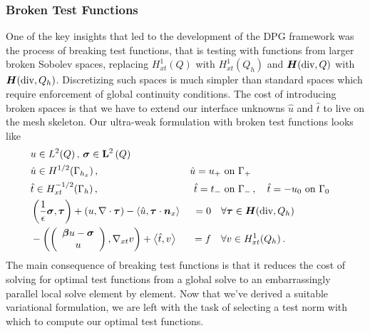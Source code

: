 \documentclass{article}
\begin{document}
\subsubsection{Broken Test Functions}
One of the key insights that led to the development of the DPG framework was the process of breaking test functions, 
that is testing with functions from larger broken Sobolev spaces, replacing $H^1_{xt}(Q)$ with  $H^1_{xt}(Q_h)$ 
and $\mbox{\boldmath $H$}(\text{div},Q)$ with $\mbox{\boldmath $H$}(\text{div},Q_h)$.
Discretizing such spaces is much simpler than standard spaces which require enforcement of global continuity conditions.
The cost of introducing broken spaces is that we have to extend our interface unknowns $\hat u$ and $\hat t$ 
to live on the mesh skeleton. %
Our ultra-weak formulation with broken test functions looks like
\begin{equation}
\label{eq:confusionUltraWeakBrokenBF}
	\begin{aligned}
		&u\in L^2(Q)\,,\,\boldsymbol\sigma\in\mathbf{L}^2\left( Q \right)\\
		&\hat u\in H^{1/2}(\Gamma_{h_x})\,,\,&\hat u=u_+&\text{ on }\Gamma_+\\
		&\hat t\in H^{-1/2}_{xt}(\Gamma_h)\,,\,&\hat t=t_-&\text{ on }\Gamma_-\,,\quad\hat t=-u_0\text{ on }\Gamma_0\\
		&\left( \frac{1}{\epsilon}\boldsymbol\sigma,\boldsymbol\tau \right)+\left( u,\nabla\cdot\boldsymbol\tau \right)-\left\langle \hat u,\boldsymbol\tau\cdot\boldsymbol n_x \right\rangle&=0\quad&\forall\boldsymbol\tau\in\mbox{\boldmath $H$}(\text{div},Q_h)\\
		&-\left( \left( \begin{array}{c} \boldsymbol\beta u-\boldsymbol\sigma\\ u\\ \end{array} \right),\nabla_{xt} v \right)+\left\langle \hat t,v \right\rangle&=f\quad&\forall v\in H^1_{xt}(Q_h)\,.
	\end{aligned}
\end{equation}
The main consequence of breaking test functions is that it reduces the cost of solving for optimal test functions from a global solve 
to an embarrassingly parallel local solve element by element.
Now that we've derived a suitable variational formulation, we are left with the task of selecting a test norm with which to compute our optimal test functions.
\end{document}
